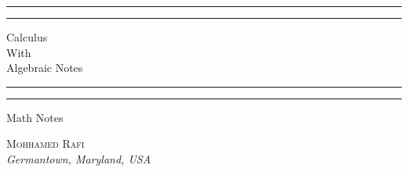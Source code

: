 \begin{titlepage} 

  \centering 
	\scshape 
	\vspace*{\baselineskip} 
	
	\rule{\textwidth}{1.6pt}\vspace*{-\baselineskip}\vspace*{2pt} 
	\rule{\textwidth}{0.4pt}
	
	\vspace{0.75\baselineskip} 
	
	{\LARGE Calculus \\ With \\ Algebraic Notes \\} 
	\vspace{0.75\baselineskip} 
	
	\rule{\textwidth}{0.4pt}\vspace*{-\baselineskip}\vspace{3.2pt} 
	\rule{\textwidth}{1.6pt} 
	\vspace{2\baselineskip} 
	
	Math Notes 
	
	\vspace*{3\baselineskip} 
  
  \vfill
  {\scshape\Large Mohhamed Rafi \\}
  \textit{Germantown, Maryland, USA} 
	\vspace{0.5\baselineskip}
	
\end{titlepage}
